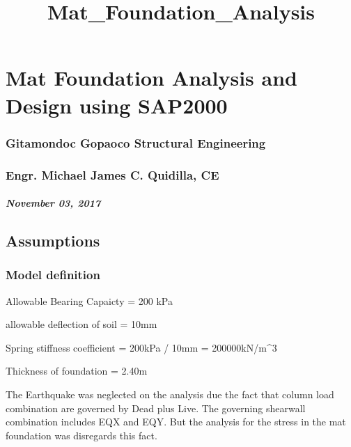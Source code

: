 \documentclass[11pt]{article}
\title{Mat\_Foundation\_Analysis}
\begin{document}
    
    
    \maketitle
    
    

    
    \hypertarget{mat-foundation-analysis-and-design-using-sap2000}{%
\section{Mat Foundation Analysis and Design using
SAP2000}\label{mat-foundation-analysis-and-design-using-sap2000}}

\hypertarget{gitamondoc-gopaoco-structural-engineering}{%
\subsubsection{Gitamondoc Gopaoco Structural
Engineering}\label{gitamondoc-gopaoco-structural-engineering}}

\hypertarget{engr.-michael-james-c.-quidilla-ce}{%
\subsubsection{Engr. Michael James C. Quidilla,
CE}\label{engr.-michael-james-c.-quidilla-ce}}

\hypertarget{november-03-2017}{%
\subparagraph{November 03, 2017}\label{november-03-2017}}

    \hypertarget{assumptions}{%
\subsection{Assumptions}\label{assumptions}}

    \hypertarget{model-definition}{%
\subsubsection{Model definition}\label{model-definition}}

    Allowable Bearing Capaicty = 200 kPa

allowable deflection of soil = 10mm

Spring stiffness coefficient = 200kPa / 10mm = 200000kN/m\^{}3

Thickness of foundation = 2.40m

The Earthquake was neglected on the analysis due the fact that column
load combination are governed by Dead plus Live. The governing shearwall
combination includes EQX and EQY. But the analysis for the stress in the
mat foundation was disregards this fact.
\end{document}
